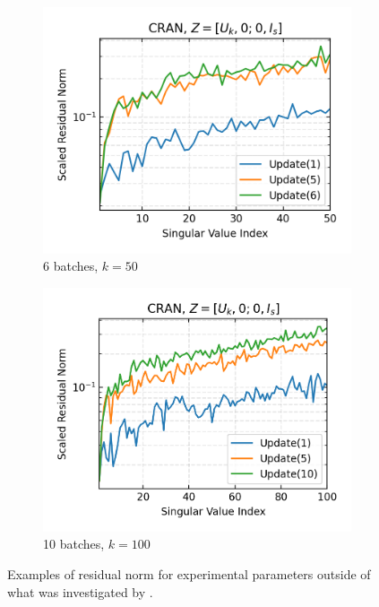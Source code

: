 \begin{figure}[h]
  \centering
  \begin{subfigure}[b]{0.49\textwidth}
    \centering
    \includegraphics[width=\textwidth]{../openreview/figures/report_figures/CRAN_zha-simon_n_batches_6_k_dims_50_res_norm.png}
    \caption{6 batches, $k=50$}
  \end{subfigure}
  \hfill
  \begin{subfigure}[b]{0.49\textwidth}
    \centering
    \includegraphics[width=\textwidth]{../openreview/figures/report_figures/CRAN_zha-simon_n_batches_10_k_dims_100_res_norm.png}
    \caption{10 batches, $k=100$}
  \end{subfigure}
  \caption{Examples of residual norm for experimental parameters outside of what was investigated by \cite{Kalantzis2021}.}
  \label{fig:cran_variations}
\end{figure}
